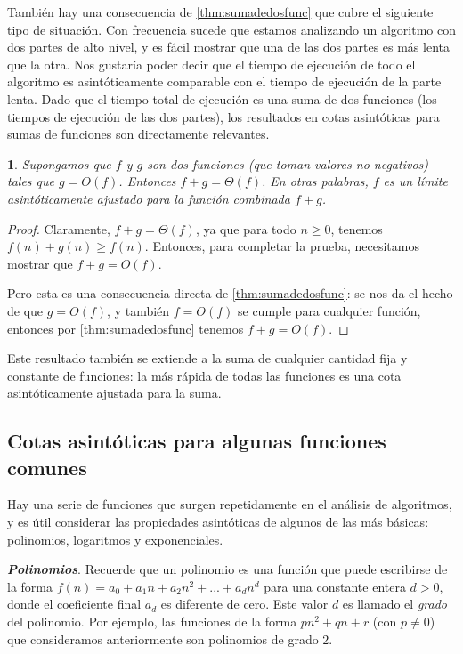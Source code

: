 \documentclass[a4paper, 12pt]{book}
\newtheorem{theorem}{}%
\begin{document}
También hay una consecuencia de \ref{thm:sumadedosfunc} que cubre el siguiente tipo de situación. Con frecuencia sucede que estamos analizando un algoritmo con dos partes de alto nivel, y es fácil mostrar que una de las dos partes es más lenta que la otra. Nos gustaría poder decir que el tiempo de ejecución de todo el algoritmo es asintóticamente comparable con el tiempo de ejecución de la parte lenta. Dado que el tiempo total de ejecución es una suma de dos funciones (los tiempos de ejecución de las dos partes), los resultados en cotas asintóticas para sumas de funciones son directamente relevantes.

\begin{theorem}
Supongamos que $f$ y $g$ son dos funciones (que toman valores no negativos) tales que $g = O(f)$. Entonces $f + g = \Theta(f)$. En otras palabras, $f$ es un límite asintóticamente ajustado para la función combinada $f + g$.
\end{theorem}

\begin{proof}
Claramente, $f + g = \Theta (f)$, ya que para todo $n ≥ 0$, tenemos $f (n) + g (n) ≥ f (n)$. Entonces, para completar la prueba, necesitamos mostrar que $f + g = O(f)$.

Pero esta es una consecuencia directa de \ref{thm:sumadedosfunc}: se nos da el hecho de que $g = O(f)$, y también $f = O (f)$ se cumple para cualquier función, entonces por \ref{thm:sumadedosfunc} tenemos $f + g = O(f)$. 
\end{proof}

Este resultado también se extiende a la suma de cualquier cantidad fija y constante de funciones: la más rápida de todas las funciones es una cota asintóticamente ajustada para la suma.

\subsection*{Cotas asintóticas para algunas funciones comunes}

Hay una serie de funciones que surgen repetidamente en el análisis de algoritmos, y es útil considerar las propiedades asintóticas de algunos de las más básicas: polinomios, logaritmos y exponenciales.

\textit{\textbf{Polinomios}}. Recuerde que un polinomio es una función que puede escribirse de la forma $f(n) = a_0 + a_1n + a_2n^2 + ... + a_dn^d$ para una constante entera $d>0$, donde el coeficiente final $a_d$ es diferente de cero. Este valor $d$ es llamado el \textit{grado} del polinomio. Por ejemplo, las funciones de la forma $pn^2 + qn + r$ (con $p \neq 0$) que consideramos anteriormente son polinomios de grado $2$.
\end{document}
